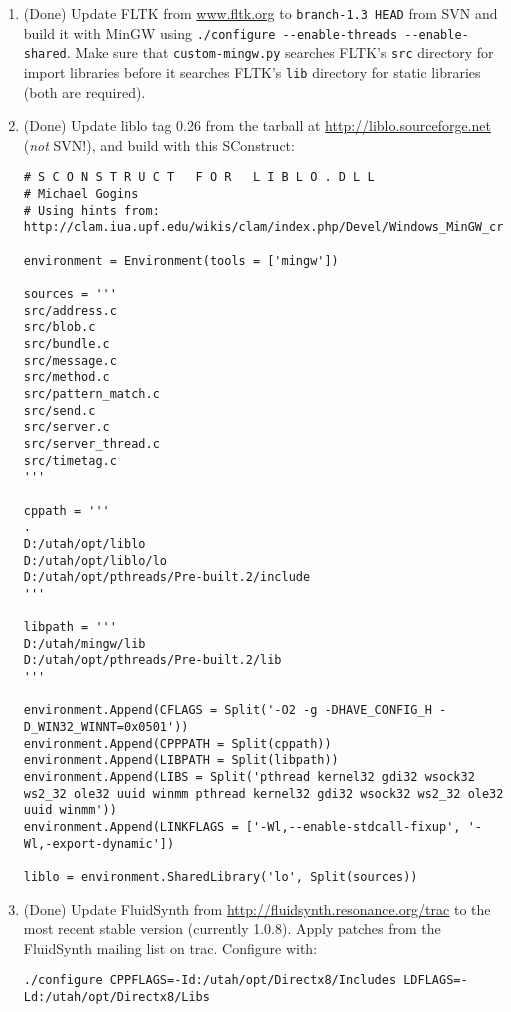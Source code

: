 \documentclass[11pt,letterpaper,onecolumn]{scrartcl}
\begin{document}
\begin{sloppypar}
\begin{enumerate}
\begin{enumerate}
    	\item (Done) Update FLTK from \url{www.fltk.org} to \texttt{branch-1.3 HEAD} from SVN and build it with MinGW using \verb|./configure --enable-threads --enable-shared|. Make sure that \texttt{custom-mingw.py} searches FLTK's \texttt{src} directory for import libraries before it searches FLTK's \texttt{lib} directory for static libraries (both are required).
     	\item (Done) Update liblo tag 0.26 from the tarball at \url{http://liblo.sourceforge.net} (\emph{not} SVN!), and build with this SConstruct:
    	
\begin{lstlisting}
# S C O N S T R U C T   F O R   L I B L O . D L L
# Michael Gogins
# Using hints from: http://clam.iua.upf.edu/wikis/clam/index.php/Devel/Windows_MinGW_cross_compile#liblo

environment = Environment(tools = ['mingw'])

sources = '''
src/address.c
src/blob.c
src/bundle.c
src/message.c
src/method.c
src/pattern_match.c
src/send.c
src/server.c
src/server_thread.c
src/timetag.c
'''

cppath = '''
.
D:/utah/opt/liblo
D:/utah/opt/liblo/lo
D:/utah/opt/pthreads/Pre-built.2/include
'''

libpath = '''
D:/utah/mingw/lib
D:/utah/opt/pthreads/Pre-built.2/lib
'''

environment.Append(CFLAGS = Split('-O2 -g -DHAVE_CONFIG_H -D_WIN32_WINNT=0x0501'))
environment.Append(CPPPATH = Split(cppath))
environment.Append(LIBPATH = Split(libpath))
environment.Append(LIBS = Split('pthread kernel32 gdi32 wsock32 ws2_32 ole32 uuid winmm pthread kernel32 gdi32 wsock32 ws2_32 ole32 uuid winmm'))
environment.Append(LINKFLAGS = ['-Wl,--enable-stdcall-fixup', '-Wl,-export-dynamic'])

liblo = environment.SharedLibrary('lo', Split(sources))
\end{lstlisting}

 			\item (Done) Update FluidSynth from \url{http://fluidsynth.resonance.org/trac} to the most recent stable version (currently 1.0.8). Apply patches from the FluidSynth mailing list on trac. Configure with:
    	
\begin{lstlisting}
./configure CPPFLAGS=-Id:/utah/opt/Directx8/Includes LDFLAGS=-Ld:/utah/opt/Directx8/Libs
\end{lstlisting}


\end{enumerate}
\end{enumerate}
\end{sloppypar}
\end{document}
